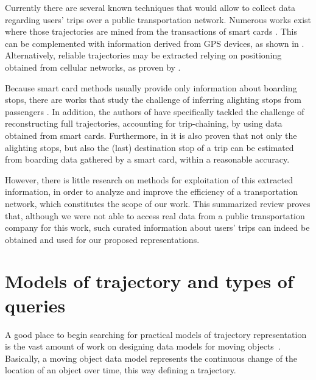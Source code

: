 \documentclass[a4paper,10pt,twoside]{book}
\begin{document}
	Currently there are several known techniques that would allow to collect data regarding users' trips over a public transportation network. Numerous works exist where those trajectories are mined from the transactions of smart cards \cite{bhaskar2015passenger,wang2014aggregated}. This can be complemented with information derived from GPS devices, as shown in \cite{ma2014development}. Alternatively, reliable trajectories may be extracted relying on positioning obtained from cellular networks, as proven by \cite{liu2017exploring}.

    Because smart card methods usually provide only information about boarding stops, there are works that study the challenge of inferring alighting stops from passengers \cite{wang2011review}. In addition, the authors of \cite{tao2014exploring} have specifically tackled the challenge of reconstructing full trajectories, accounting for trip-chaining, by using data obtained from smart cards. Furthermore, in \cite{alsger2016validating} it is also proven that not only the alighting stops, but also the (last) destination stop of a trip can be estimated from boarding data gathered by a smart card, within a reasonable accuracy.
    
    However, there is little research on methods for exploitation of this extracted information, in order to analyze and improve the efficiency of a transportation network, which constitutes the scope of our work. This summarized review proves that, although we were not able to access real data from a public transportation company for this work, such curated information about users' trips can indeed be obtained and used for our proposed representations.
	
	\section{Models of trajectory and types of queries}
    A good place to begin searching for practical models of trajectory representation is the vast amount of work on designing data models for moving objects~\cite{DBLP:conf/ssdbm/WolfsonXCJ98,DBLP:conf/icde/SistlaWCD97,DBLP:journals/tods/GutingBEJLSV00,DBLP:conf/chorochronos/GutingBEJLNSV03,DBLP:journals/geoinformatica/Spaccapietra01,DBLP:conf/sigmod/ForlizziGNS00,DBLP:journals/geoinformatica/ErwigGSV99,DBLP:books/mk/GutingS2005}. Basically, a moving object data model represents the continuous change of the location of an object over time, this way defining a trajectory.
    
\end{document}
